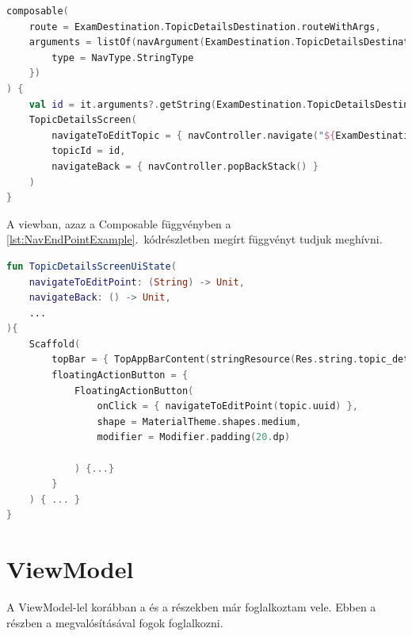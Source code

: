 \begin{lstlisting}[caption={Példa egy végpont felvételére a navigációs gráfban.}, label={lst:NavEndPointExample}, language=Kotlin]
composable(
    route = ExamDestination.TopicDetailsDestination.routeWithArgs,
    arguments = listOf(navArgument(ExamDestination.TopicDetailsDestination.topicIdArg) {
        type = NavType.StringType
    })
) {
    val id = it.arguments?.getString(ExamDestination.TopicDetailsDestination.topicIdArg) ?: "0"
    TopicDetailsScreen(
        navigateToEditTopic = { navController.navigate("${ExamDestination.TopicEditDestination.route}/$id") },
        topicId = id,
        navigateBack = { navController.popBackStack() }
    )
}    
\end{lstlisting}

A viewban, azaz a Composable függvényben a \ref{lst:NavEndPointExample}.~kódrészletben megírt függvényt tudjuk meghívni.

\begin{lstlisting}[caption={A navigáció viewban való megjelenése.}, label={lst:NavView}, language=Kotlin]
fun TopicDetailsScreenUiState(
    navigateToEditPoint: (String) -> Unit,
    navigateBack: () -> Unit,
    ...
){
    Scaffold(
        topBar = { TopAppBarContent(stringResource(Res.string.topic_details), navigateBack) },
        floatingActionButton = {
            FloatingActionButton(
                onClick = { navigateToEditPoint(topic.uuid) },
                shape = MaterialTheme.shapes.medium,
                modifier = Modifier.padding(20.dp)

            ) {...}
        }
    ) { ... }
}

\end{lstlisting}

\section{ViewModel}
\label{sec:VM}

A ViewModel-lel korábban a  és a  részekben már foglalkoztam vele.
Ebben a részben a megvalósításával fogok foglalkozni.

